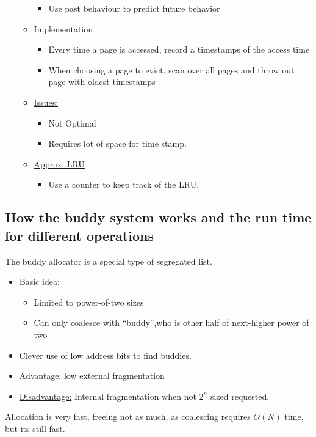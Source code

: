 \documentclass[a4paper]{article}
\begin{document}
\begin{itemize}
\begin{itemize}
\begin{itemize}
          \item Use past behaviour to predict future behavior
        \end{itemize}
      \item Implementation
        \begin{itemize}
          \item Every time a page is accessed, record a timestamps of the access time
          \item When choosing a page to evict, scan over all pages and throw out page with oldest timestamps
        \end{itemize}
      \item \underline{Issues:}
        \begin{itemize}
          \item Not Optimal
          \item Requires lot of space for time stamp.
        \end{itemize}
      \item \underline{Approx. LRU}
      \begin{itemize}
        \item Use a counter to keep track of the LRU.
      \end{itemize}
    \end{itemize}
\end{itemize}
\subsection{How the buddy system works and the run time for different operations} %
\label{sub:How the buddy system works and the run time for different operations}
The buddy allocator is a special type of segregated list. 
\begin{itemize}
  \item Basic idea:
    \begin{itemize}
      \item Limited to power-of-two sizes
      \item Can only coalesce with ``buddy'',who is other half of next-higher power of two
    \end{itemize}
  \item Clever use of low address bits to find buddies.
  \item \underline{Advantage:} low external fragmentation
  \item \underline{Disadvantage:} Internal fragmentation when not $2^n$ sized requested.
\end{itemize}
Allocation is very fast, freeing not as much, as coalescing requires $O(N)$ time, but its still fast.
\end{document}
